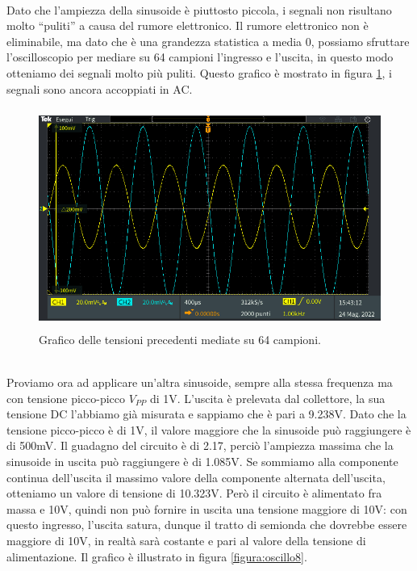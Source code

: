 \documentclass{report}
\begin{document}
\\Dato che l'ampiezza della sinusoide è piuttosto piccola, i segnali non risultano molto ``puliti'' a causa del rumore elettronico. Il rumore elettronico non è eliminabile, ma dato che è una grandezza statistica a media 0, possiamo sfruttare l'oscilloscopio per mediare su 64 campioni l'ingresso e l'uscita, in questo modo otteniamo dei segnali molto più puliti. Questo grafico è mostrato in figura \ref{figura:oscillo7}, i segnali sono ancora accoppiati in AC.  
\begin{figure}[h]
\centering
\includegraphics[height=7.2cm]{immagini/oscillo7}
\caption{Grafico delle tensioni precedenti mediate su 64 campioni.}
\label{figura:oscillo7}
\end{figure}
\\Proviamo ora ad applicare un'altra sinusoide, sempre alla stessa frequenza ma con tensione picco-picco $V_{PP}$ di 1V. L'uscita è prelevata dal collettore, la sua tensione DC l'abbiamo già misurata e sappiamo che è pari a 9.238V. Dato che la tensione picco-picco è di 1V, il valore maggiore che la sinusoide può raggiungere è di 500mV. Il guadagno del circuito è di 2.17, perciò l'ampiezza massima che la sinusoide in uscita può raggiungere è di 1.085V. Se sommiamo alla componente continua dell'uscita il massimo valore della componente alternata dell'uscita, otteniamo un valore di tensione di 10.323V. Però il circuito è alimentato fra massa e 10V, quindi non può fornire in uscita una tensione maggiore di 10V: con questo ingresso, l'uscita satura, dunque il tratto di semionda che dovrebbe essere maggiore di 10V, in realtà sarà costante e pari al valore della tensione di alimentazione. Il grafico è illustrato in figura \ref{figura:oscillo8}.
\end{document}
